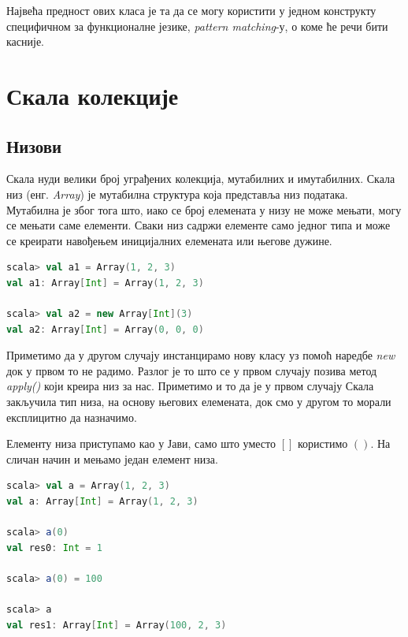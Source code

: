 \documentclass[12pt,oneside]{memoir}
\begin{document}
Највећа предност ових класа је та да се могу користити у једном конструкту специфичном за функционалне језике, \textit{pattern matching}-у, о коме ће речи бити касније. \cite{scala_prog}


\section{Скала колекције}
\label{sec:scala_coll}

\subsection{Низови}
\label{subsec:scala_arrays}

Скала нуди велики број уграђених колекција, мутабилних и имутабилних. Скала низ (енг. \textit{Array}) је мутабилна структура која представља низ података. Мутабилна је због тога што, иако се број елемената у низу не може мењати, могу се мењати саме елементи. Сваки низ садржи елементе само једног типа и може се креирати навођењем иницијалних елемената или његове дужине. \cite{scala_prog}

\begin{lstlisting}[language=Scala]
scala> val a1 = Array(1, 2, 3)
val a1: Array[Int] = Array(1, 2, 3)

scala> val a2 = new Array[Int](3)
val a2: Array[Int] = Array(0, 0, 0)
\end{lstlisting}

Приметимо да у другом случају инстанцирамо нову класу уз помоћ наредбе \textit{new} док у првом то не радимо. Разлог је то што се у првом случају позива метод \textit{apply()} који креира низ за нас. Приметимо и то да је у првом случају Скала закључила тип низа, на основу његових елемената, док смо у другом то морали експлицитно да назначимо. \cite{scala_prog}

Елементу низа приступамо као у Јави, само што уместо $[]$ користимо $()$. На сличан начин и мењамо један елемент низа.

\begin{lstlisting}[language=Scala]
scala> val a = Array(1, 2, 3)
val a: Array[Int] = Array(1, 2, 3)

scala> a(0)
val res0: Int = 1

scala> a(0) = 100

scala> a
val res1: Array[Int] = Array(100, 2, 3)
\end{lstlisting}
\end{document}
